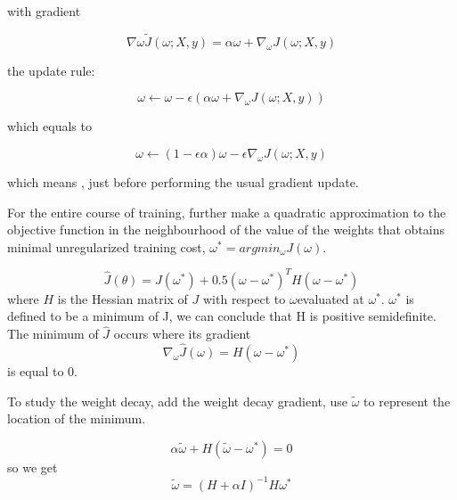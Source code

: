 \documentclass{article}
\begin{document}
with gradient

\begin{equation}
\nabla{\omega}\tilde{J}(\omega; X, y) = \alpha \omega + \nabla_{\omega}J(\omega; X, y)
\end{equation}
 
 the update rule:

\begin{equation}
\omega \gets \omega - \epsilon(\alpha \omega + \nabla_{\omega}J(\omega; X, y))
\end{equation}

which equals to

\begin{equation}
\omega \gets (1 - \epsilon \alpha) \omega - \epsilon \nabla_{\omega}J(\omega; X, y)
\end{equation}

which means {\color{red}{ the addition of the weight decay term has modified the learning rule to multiplicatively shrink the weight vector by a constant factor on each step}}, just before performing the usual gradient update.

For the entire course of training, further make a quadratic approximation to the objective function in the neighbourhood of the value of the weights that obtains minimal unregularized training cost, $\omega^* = argmin_\omega J(\omega)$.

\begin{equation}
\hat{J}(\theta) = J(\omega^*) + 0.5(\omega - \omega^*)^T H(\omega - \omega^*)
\end{equation}
 where $H$ is the Hessian matrix of $J$ with respect to $\omega $evaluated at $\omega^*$.
 $\omega^*$ is defined to be a minimum of J, we can conclude that H is positive semidefinite.
 The minimum of $\hat{J}$ occurs where its gradient
 \begin{equation}
 \nabla_\omega\hat{J}(\omega) = H(\omega - \omega^*)
 \end{equation}
is equal to 0.

To  study the weight decay, add the weight decay gradient, use $\tilde{\omega}$ to represent the location of the minimum.

\begin{equation}
\alpha \tilde{\omega} + H(\tilde{\omega} - \omega^*) = 0
\end{equation}
so we get 
\begin{equation}
\tilde{\omega} = (H + \alpha I)^{-1}H \omega^*
\end{equation}
\end{document}
